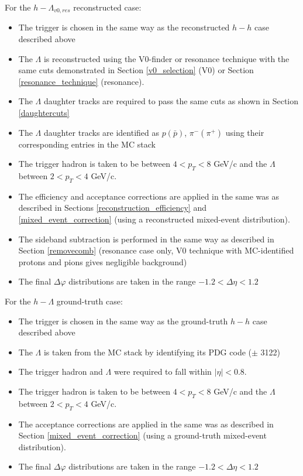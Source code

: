 \documentclass[ALICE,manyauthors]{ALICE_analysis_notes}
\begin{document}
For the $h-\Lambda_{v0, res}$ reconstructed case: 
\begin{itemize}
\item The trigger is chosen in the same way as the reconstructed $h-h$ case described above
\item The $\Lambda$ is reconstructed using the V0-finder or resonance technique with the same cuts demonstrated in Section \ref{v0_selection} (V0) or Section \ref{resonance_technique} (resonance).
\item The $\Lambda$ daughter tracks are required to pass the same cuts as shown in Section \ref{daughtercuts}
\item The $\Lambda$ daughter tracks are identified as $p (\bar{p})$, $\pi^{-} (\pi^{+})$ using their corresponding entries in the MC stack
\item The trigger hadron is taken to be between $4 < p_{T} < 8$ GeV/c and the $\Lambda$ between $2 < p_{T} < 4$ GeV/c. 
\item The efficiency and acceptance corrections are applied in the same was as described in Sections \ref{reconstruction_efficiency} and \ref{mixed_event_correction} (using a reconstructed mixed-event distribution). 
\item The sideband subtraction is performed in the same way as described in Section \ref{removecomb} (resonance case only, V0 technique with MC-identified protons and pions gives negligible background)
\item The final $\Delta\varphi$ distributions are taken in the range $-1.2 < \Delta\eta < 1.2$
\end{itemize}

For the $h-\Lambda$ ground-truth case: 
\begin{itemize}
\item The trigger is chosen in the same way as the ground-truth $h-h$ case described above
\item The $\Lambda$ is taken from the MC stack by identifying its PDG code ($\pm$ 3122)
\item The trigger hadron and $\Lambda$ were required to fall within $|\eta| < 0.8$.
\item The trigger hadron is taken to be between $4 < p_{T} < 8$ GeV/c and the $\Lambda$ between $2 < p_{T} < 4$ GeV/c. 
\item The acceptance corrections are applied in the same was as described in Section \ref{mixed_event_correction} (using a ground-truth mixed-event distribution). 
\item The final $\Delta\varphi$ distributions are taken in the range $-1.2 < \Delta\eta < 1.2$
\end{itemize}
\end{document}
